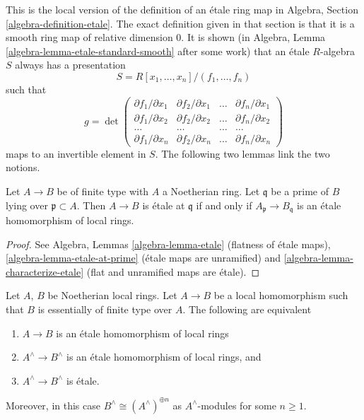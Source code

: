 \noindent
This is the local version of the definition of an \'etale ring map
in Algebra, Section \ref{algebra-definition-etale}. The exact definition
given in that section is that it is a smooth ring map of relative
dimension $0$. It is shown (in
Algebra, Lemma \ref{algebra-lemma-etale-standard-smooth} after some work)
that an \'etale $R$-algebra $S$ always has a presentation
$$
S = R[x_1, \ldots, x_n]/(f_1, \ldots, f_n)
$$
such that
$$
g =
\det
\left(
\begin{matrix}
\partial f_1/\partial x_1 &
\partial f_2/\partial x_1 &
\ldots &
\partial f_n/\partial x_1 \\
\partial f_1/\partial x_2 &
\partial f_2/\partial x_2 &
\ldots &
\partial f_n/\partial x_2 \\
\ldots & \ldots & \ldots & \ldots \\
\partial f_1/\partial x_n &
\partial f_2/\partial x_n &
\ldots &
\partial f_n/\partial x_n
\end{matrix}
\right)
$$
maps to an invertible element in $S$. The following two lemmas link the two
notions.

\begin{lemma}
\label{lemma-characterize-etale-Noetherian}
Let $A \to B$ be of finite type with $A$ a Noetherian ring.
Let $\mathfrak q$ be a prime of $B$ lying over $\mathfrak p \subset A$.
Then $A \to B$ is \'etale at $\mathfrak q$ if and only if
$A_{\mathfrak p} \to B_{\mathfrak q}$ is an \'etale homomorphism
of local rings.
\end{lemma}

\begin{proof}
See Algebra, Lemmas \ref{algebra-lemma-etale} (flatness of \'etale maps),
\ref{algebra-lemma-etale-at-prime} (\'etale maps are unramified)
and \ref{algebra-lemma-characterize-etale} (flat and unramified maps
are \'etale).
\end{proof}

\begin{lemma}
\label{lemma-characterize-etale-completions}
Let $A$, $B$ be Noetherian local rings.
Let $A \to B$ be a local homomorphism such that $B$ is essentially of
finite type over $A$.
The following are equivalent
\begin{enumerate}
\item $A \to B$ is an \'etale homomorphism of local rings
\item $A^\wedge \to B^\wedge$ is an \'etale homomorphism of local rings, and
\item $A^\wedge \to B^\wedge$ is \'etale.
\end{enumerate}
Moreover, in this case $B^\wedge \cong (A^\wedge)^{\oplus n}$ as
$A^\wedge$-modules for some $n \geq 1$.
\end{lemma}

